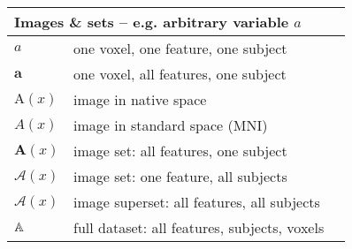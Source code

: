 \begin{singlespacing}
\begin{table}[H]
\begin{tabular}{lll}
  	\multicolumn{3}{l}{Images \& sets -- e.g. arbitrary variable $a$}                                                        \\ \hline
  	$a$                   & one voxel, one feature, one subject                                        &                     \\
  	$\bm{a}$              & one voxel, all features, one subject                                       &                     \\
  	$\mathrm{A}(x)$       & image in native space                                                      &                     \\
  	$A(x)$                & image in standard space (MNI)                                              &                     \\
  	$\bm{A}(x)$           & image set: all features, one subject                                       &                     \\
  	$\mathcal{A}(x)$      & image set: one feature, all subjects                                       &                     \\
  	$\bm{\mathcal{A}}(x)$ & image superset: all features, all subjects                                 &                     \\
  	$\mathbb{A}$             & full dataset: all features, subjects, voxels                               &                     \\ \hline
  \end{tabular}
\end{table}
\end{singlespacing}
\clearpage
{}
\setcounter{page}{1}
